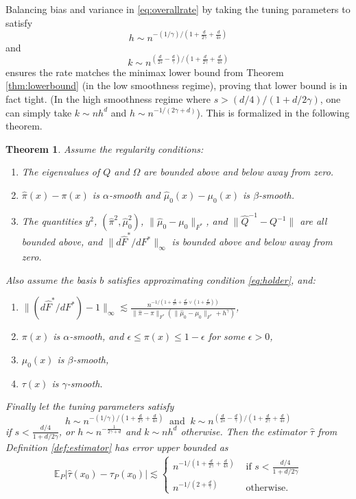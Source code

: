 \documentclass[11pt,twoside]{article}
\newcommand{\E}{\mathbb{E}}
\newcommand{\Holder}{\text{H\"{o}lder}}
\newtheorem{theorem}{Theorem}
\theoremstyle{definition}
\theoremstyle{remark}
\begin{document}
Balancing bias and variance in \eqref{eq:overallrate} by taking the tuning parameters to satisfy 
$$h \sim n^{-(1/\gamma)/\left(1 + \frac{d}{2\gamma} + \frac{d}{4s} \right) } $$
and
$$ k \sim n^{\left( \frac{d}{2s} - \frac{d}{\gamma} \right)/\left(1 + \frac{d}{2\gamma} + \frac{d}{4s} \right) } $$
ensures the rate matches the minimax lower bound from Theorem \ref{thm:lowerbound} (in the low smoothness regime), proving that lower bound is in fact tight. (In the high smoothness regime where $s>(d/4)/(1+d/2\gamma)$, one can simply take $k \sim nh^d$ and $h \sim n^{-1/(2\gamma+d)}$). This is formalized in the following theorem. \\

\begin{theorem} \label{thm:upperbound}
Assume the regularity conditions:
\begin{enumerate}[label=\Alph*]
\item[A.] The eigenvalues of $Q$ and $\Omega$ are bounded above and below away from zero. \label{cnd:reg1}
\item[B.] $\widehat\pi(x)-\pi(x)$ is $\alpha$-smooth and $\widehat\mu_0(x) - \mu_0(x)$ is $\beta$-smooth. \label{cnd:reg2}
\item[C.] The quantities $y^2$, $(\widehat\pi^2 , \widehat\mu_0^2)$, $\| \widehat\mu_0 - \mu_0 \|_{F^*}$, and $ \| \widehat{Q}^{-1} - {Q}^{-1} \|$  are all bounded above, and $\| d\widehat{F}^*/dF^* \|_\infty$ is bounded above and below away from zero. \label{cnd:reg3}
\end{enumerate}
Also assume the basis $b$  satisfies \Holder{} approximating condition \eqref{eq:holder},  and:
\begin{enumerate}
\item $\| (d\widehat{F}^*/dF^*)-1 \|_\infty \lesssim \frac{n^{-1/\left(1 + \frac{d}{2\gamma} + \frac{d}{4s} \vee \left(1 + \frac{d}{2\gamma}\right) \right) }  }{ \| \widehat\pi-\pi \|_{F^*} (\| \widehat\mu_0-\mu_0 \|_{F^*} + h^\gamma)}$, \label{cnd:covest}
\item $\pi(x)$ is $\alpha$-smooth, and $\epsilon \leq \pi(x) \leq 1-\epsilon$ for some $\epsilon>0$, 
\item $\mu_0(x)$ is $\beta$-smooth, 
\item $\tau(x)$ is $\gamma$-smooth.
\end{enumerate}
Finally let the tuning parameters satisfy
$$  h \sim n^{-(1/\gamma)/\left(1 + \frac{d}{2\gamma} + \frac{d}{4s} \right) } \ \text{ and } \ k \sim n^{\left( \frac{d}{2s} - \frac{d}{\gamma} \right)/\left(1 + \frac{d}{2\gamma} + \frac{d}{4s} \right) }  $$
if $s < \frac{d/4}{1+d/2\gamma}$, or $h \sim n^{-\frac{1}{2\gamma+d} }$ and $k \sim nh^d$ otherwise. 
Then the estimator $\widehat\tau$ from Definition \ref{def:estimator} has error upper bounded as
\begin{align*}
\E_P | \widehat\tau(x_0) - \tau_P(x_0)| \lesssim \begin{cases}
n^{-1/\left(1 + \frac{d}{2\gamma} + \frac{d}{4s} \right) } & \text{ if } s < \frac{d/4}{1+d/2\gamma}  \\
n^{-1/\left(2 + \frac{d}{\gamma}  \right) } & \text{ otherwise.} 
\end{cases}
\end{align*}
\end{theorem}
\end{document}
